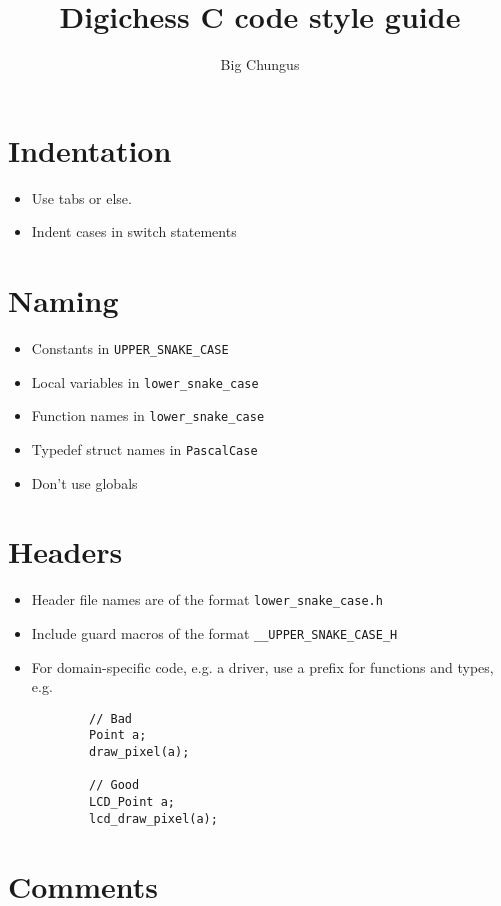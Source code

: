 \documentclass{article}
\title{Digichess C code style guide}
\author{Big Chungus}
\begin{document}
\maketitle

\section{Indentation}

\begin{itemize}
	\item Use tabs or else.
	\item Indent cases in switch statements
\end{itemize}

\section{Naming}

\begin{itemize}
	\item Constants in \lstinline{UPPER_SNAKE_CASE}
	\item Local variables in \lstinline{lower_snake_case}
	\item Function names in \lstinline{lower_snake_case}
	\item Typedef struct names in \lstinline{PascalCase}
	\item Don't use globals
\end{itemize}

\section{Headers}

\begin{itemize}
	\item Header file names are of the format \lstinline{lower_snake_case.h}
	\item Include guard macros of the format \lstinline{__UPPER_SNAKE_CASE_H}
	\item For domain-specific code, e.g. a driver, use a prefix for functions and types, e.g.
	
	\begin{lstlisting}
		// Bad
		Point a;
		draw_pixel(a);

		// Good
		LCD_Point a;
		lcd_draw_pixel(a);
	\end{lstlisting}
\end{itemize}

\section{Comments}
\end{document}
